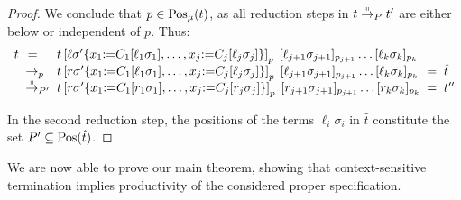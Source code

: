 \documentclass{eptcs}
\begin{document}
\begin{proof}
We conclude that $p \in \mathrm{Pos}_\mu(t)$, as all reduction steps in
$t \mathrel{\smash{\overset{\shortparallel}{\rightarrow}}}_P t'$ are either below or independent of $p$. Thus:
\[
\begin{array}{r@{\;\;}l@{\;\;}l@{\;\;}c@{\;\;}l}
t &\,=&
t\left[ \ell\sigma'
        \{
            x_1 {:=} C_1[\ell_1\sigma_1], \dotsc, x_j {:=} C_j[\ell_j\sigma_j]
        \}
\right]_{p}\;
    [\ell_{j+1}\sigma_{j+1}]_{p_{j+1}} \ldots [\ell_k\sigma_k]_{p_k}
\\
&\to_{p}&
t\left[ r\sigma'
        \{
            x_1 {:=} C_1[\ell_1\sigma_1], \dotsc, x_j {:=} C_j[\ell_j\sigma_j]
        \}
\right]_{p}\;
    [\ell_{j+1}\sigma_{j+1}]_{p_{j+1}} \ldots [\ell_k\sigma_k]_{p_k}
&=& \hat{t}
\\
&\parto_{P'}&
t\left[ r\sigma'
        \{
            x_1 {:=} C_1[r_1\sigma_1], \dotsc, x_j {:=} C_j[r_j\sigma_j]
        \}
\right]_{p}\;
    [r_{j+1}\sigma_{j+1}]_{p_{j+1}} \ldots [r_k\sigma_k]_{p_k}
&=& t''
\end{array}
\]

In the second reduction step, the positions of the terms $\ell_i\sigma_i$
in $\hat{t}$ constitute the set $P' \subseteq \mathrm{Pos}(\hat{t})$.
\end{proof}

We are now able to prove our main theorem, showing that context-sensitive
termination implies productivity of the considered proper specification.
\end{document}
